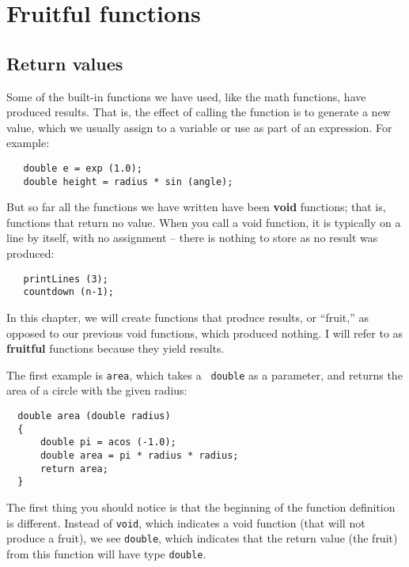 

\chapter{Fruitful functions}

\section{Return values}

Some of the built-in functions we have used, like the math
functions, have produced results.  That is, the effect of
calling the function is to generate a new value, which we
usually assign to a variable or use as part of an expression.
For example:


\begin{verbatim}
   double e = exp (1.0);
   double height = radius * sin (angle);
\end{verbatim}
%
But so far all the functions we have written have been {\bf void}
functions; that is, functions that return no value.  When you call
a void function, it is typically on a line by itself, with
no assignment -- there is nothing to store as no result was produced:

\begin{verbatim}
   printLines (3);
   countdown (n-1);
\end{verbatim}
%
In this chapter, we will create functions that produce results, or ``fruit,'' 
as opposed to our previous void functions, which produced nothing. 
I will refer to as {\bf fruitful} functions because they yield results.

The first example is {\tt area}, which takes a {\tt
double} as a parameter, and returns the area of a circle with the
given radius:


\begin{verbatim}
  double area (double radius) 
  {
      double pi = acos (-1.0); 
      double area = pi * radius * radius;
      return area;
  }
\end{verbatim}
%
The first thing you should notice is that the beginning of the
function definition is different.  Instead of {\tt void}, which
indicates a void function (that will not produce a fruit), we see {\tt double}, which indicates that
the return value (the fruit) from this function will have type {\tt double}. 

